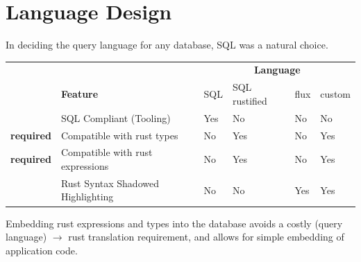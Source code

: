 \section{Language Design}
In deciding the query language for any database, SQL was a natural choice.
\begin{center}
    \begin{tabular}{l l | l l l l}
                          &                                   & \multicolumn{4}{c}{\textbf{Language}}                                 \\
                          & \textbf{Feature}                  & SQL                                   & SQL rustified & flux & custom \\
        \hline
                          & SQL Compliant (Tooling)           & Yes                                   & No            & No   & No     \\
        \textbf{required} & Compatible with rust types        & No                                    & Yes           & No   & Yes    \\
        \textbf{required} & Compatible with rust expressions  & No                                    & Yes           & No   & Yes    \\
                          & Rust Syntax Shadowed Highlighting & No                                    & No            & Yes  & Yes    \\
    \end{tabular}
\end{center}
\noindent
Embedding rust expressions and types into the database avoids a costly (query language) $\to$ rust translation
requirement, and allows for simple embedding of application code.
